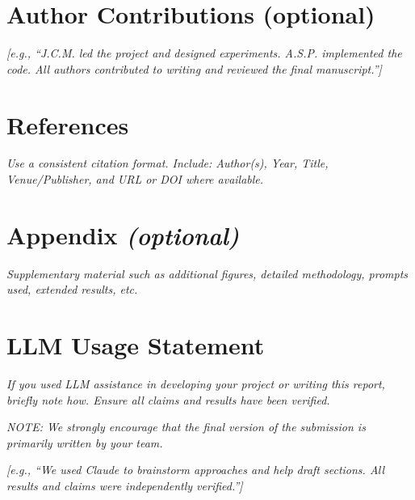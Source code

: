 \documentclass[11pt,letterpaper]{article}
\newcommand{\guide}[1]{\textit{#1}}
\begin{document}
\section*{Author Contributions (optional)}

\guide{[e.g., ``J.C.M. led the project and designed experiments. A.S.P.
implemented the code. All authors contributed to writing and reviewed the final
manuscript.'']}

\section*{References}

\guide{Use a consistent citation format. Include: Author(s), Year, Title,
Venue/Publisher, and URL or DOI where available.}




\section*{Appendix \textit{(optional)}}

\guide{Supplementary material such as additional figures, detailed methodology,
prompts used, extended results, etc.}

\section*{LLM Usage Statement}

\guide{If you used LLM assistance in developing your project or writing this
report, briefly note how. Ensure all claims and results have been verified.}

\guide{NOTE: We strongly encourage that the final version of the submission is
primarily written by your team.}

\guide{[e.g., ``We used Claude to brainstorm approaches and help draft sections.
All results and claims were independently verified.'']}
\end{document}

